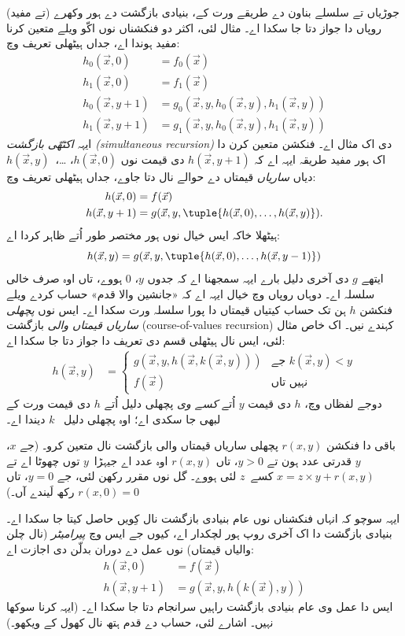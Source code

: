 \documentclass[../../../include/open-logic-section]{subfiles}
\begin{document}

جوڑیاں تے سلسلے بناون دے طریقے ورت کے، بنیادی
بازگشت دے ہور وکھرے (تے مفید) روپاں دا جواز دتا جا
سکدا اے۔ مثال لئی، اکثر دو فنکشناں نوں اکّو ویلے
متعین کرنا مفید ہوندا اے، جداں ہیٹھلی تعریف وچ:
\begin{align*}
h_0(\vec x, 0) & = f_0(\vec x) \\
h_1(\vec x, 0) & = f_1(\vec x) \\
h_0(\vec x, y+1) & = g_0(\vec x, y, h_0(\vec x, y), h_1(\vec x, y)) \\
h_1(\vec x, y+1) & = g_1(\vec x, y, h_0(\vec x, y), h_1(\vec x, y))
\end{align*}
ایہہ \emph{اکٹھّی بازگشت (simultaneous recursion)}
دی اک مثال اے۔ فنکشن متعین کرن دا اک ہور مفید طریقہ
ایہہ اے کہ $h(\vec x, y+1)$ دی قیمت نوں
$h(\vec x, 0)$، \dots،~$h(\vec x, y)$ دیاں
\emph{ساریاں} قیمتاں دے حوالے نال دتا جاوے، جداں
ہیٹھلی تعریف وچ:
\begin{align*}
h(\vec x, 0) & = f(\vec x) \\
h(\vec x, y+1) & = g(\vec x, y, \tuple{h(\vec x, 0), \dots, h(\vec x, y)}).
\end{align*}
ہیٹھلا خاکہ ایس خیال نوں ہور مختصر طور اُتے ظاہر
کردا اے:
\[
h(\vec x, y) = g(\vec x, y, \tuple{h(\vec x, 0), \dots, h(\vec x, y-1)})
\]
ایتھے $g$ دی آخری دلیل بارے ایہہ سمجھنا اے کہ
جدوں $y$، $0$ ہووے، تاں اوہ صرف خالی سلسلہ اے۔ دوہاں
روپاں وچ خیال ایہہ اے کہ «جانشین والا قدم» حساب
کردے ویلے فنکشن $h$ ہن تک حساب کیتیاں قیمتاں
دا پورا سلسلہ ورت سکدا اے۔ ایس نوں
\emph{پچھلی ساریاں قیمتاں والی} بازگشت
(course-of-values recursion) کہندے نیں۔ اک خاص
مثال لئی، ایس نال ہیٹھلی قسم دی تعریف دا جواز دتا
جا سکدا اے:
\begin{align*}
h(\vec x, y) & = \begin{cases}
  g(\vec x, y, h(\vec x, k(\vec x, y))) & \text{جے $k(\vec x, y) < y$} \\
  f(\vec x) & \text{نہیں تاں}
\end{cases}
\end{align*}
دوجے لفظاں وچ، $h$ دی قیمت $y$ اُتے
\emph{کسے وی} پچھلی دلیل اُتے $h$ دی قیمت ورت کے
لبھی جا سکدی اے؛ اوہ پچھلی دلیل
~$k$ دیندا اے۔

\begin{prob}
  باقی دا فنکشن $r(x,y)$ پچھلی ساریاں قیمتاں والی
  بازگشت نال متعین کرو۔ (جے $x$، $y$ قدرتی عدد
  ہون تے $y > 0$، تاں $r(x,y)$ اوہ عدد اے
  جیہڑا~$y$ توں چھوٹا اے تے
  $x = z\times y + r(x,y)$ کسے~$z$ لئی ہووے۔ گل نوں مقرر
  رکھن لئی، جے $y=0$، تاں $r(x,0) = 0$
  رکھ لَیندے آں۔)
\end{prob}

ایہہ سوچو کہ انہاں فنکشناں نوں عام بنیادی بازگشت
نال کِویں حاصل کیتا جا سکدا اے۔ بنیادی بازگشت دا
اک آخری روپ ہور لچکدار اے، کیوں جے ایس وچ
\emph{پیرامیٹر} (نال چلن والیاں قیمتاں) نوں عمل
دے دوران بدلّن دی اجازت اے:
\begin{align*}
h(\vec x, 0) & = f(\vec x) \\
h(\vec x, y+1) & = g(\vec x, y, h(k(\vec x), y))
\end{align*}
ایس دا عمل وی عام بنیادی بازگشت راہیں سرانجام دتا
جا سکدا اے۔ (ایہہ کرنا سوکھا نہیں۔ اشارے لئی، حساب
دے قدم ہتھ نال کھول کے ویکھو۔)
\end{document}
